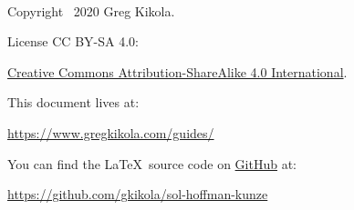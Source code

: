 \ \vspace{30mm}

\noindent Copyright \textcopyright\ 2020 Greg Kikola.

\noindent License CC BY-SA 4.0:
\begin{center}
  \href{http://creativecommons.org/licenses/by-sa/4.0/}{Creative Commons
  Attribution-ShareAlike 4.0 International}.
\end{center}
\vspace{30mm}

\noindent This document lives at:
\begin{center}
  \href{https://www.gregkikola.com/guides/}
  {https://www.gregkikola.com/guides/}
\end{center}
You can find the \LaTeX\ source code on
\href{https://github.com/}{GitHub} at:
\begin{center}
  \href{https://github.com/gkikola/sol-hoffman-kunze}
  {https://github.com/gkikola/sol-hoffman-kunze}
\end{center}
